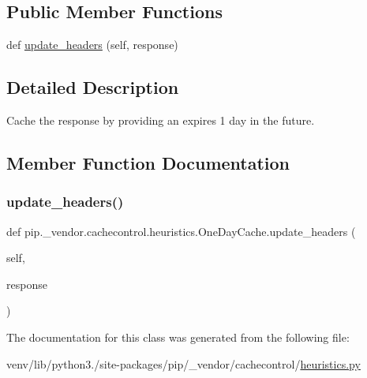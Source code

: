 \subsection*{Public Member Functions}
\begin{DoxyCompactItemize}
\item 
def \hyperlink{classpip_1_1__vendor_1_1cachecontrol_1_1heuristics_1_1OneDayCache_ac51c9a27112c7ed981e425ff6138336e}{update\+\_\+headers} (self, response)
\end{DoxyCompactItemize}


\subsection{Detailed Description}
\begin{DoxyVerb}Cache the response by providing an expires 1 day in the
future.
\end{DoxyVerb}
 

\subsection{Member Function Documentation}
\mbox{\label{classpip_1_1__vendor_1_1cachecontrol_1_1heuristics_1_1OneDayCache_ac51c9a27112c7ed981e425ff6138336e}} 
\subsubsection{\texorpdfstring{update\+\_\+headers()}{update\_headers()}}
{\footnotesize\ttfamily def pip.\+\_\+vendor.\+cachecontrol.\+heuristics.\+One\+Day\+Cache.\+update\+\_\+headers (\begin{DoxyParamCaption}\item[{}]{self,  }\item[{}]{response }\end{DoxyParamCaption})}



The documentation for this class was generated from the following file\+:\begin{DoxyCompactItemize}
\item 
venv/lib/python3./site-\/packages/pip/\+\_\+vendor/cachecontrol/\hyperlink{heuristics_8py}{heuristics.\+py}\end{DoxyCompactItemize}

